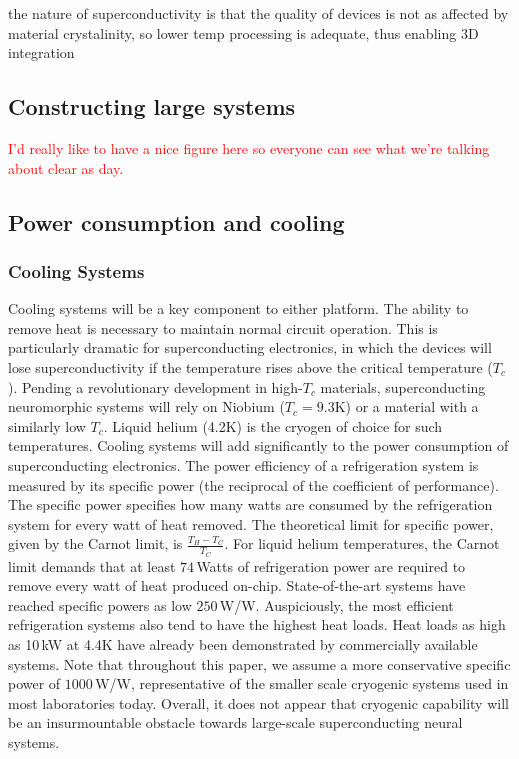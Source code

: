 \documentclass[twocolumn]{article}
\begin{document}
the nature of superconductivity is that the quality of devices is not as affected by material crystalinity, so lower temp processing is adequate, thus enabling 3D integration

\subsection{Constructing large systems}

\textcolor{Red}{I'd really like to have a nice figure here so everyone can see what we're talking about clear as day.}

\subsection{Power consumption and cooling}

\subsubsection{Cooling Systems}
Cooling systems will be a key component to either platform. The ability to remove heat is necessary to maintain normal circuit operation. This is particularly dramatic for superconducting electronics, in which the devices will lose superconductivity if the temperature rises above the critical temperature ($T_c$). Pending a revolutionary development in high-$T_c$ materials, superconducting neuromorphic systems will rely on Niobium ($T_c = 9.3$K) or a material with a similarly low $T_c$. Liquid helium (4.2K) is the cryogen of choice for such temperatures. Cooling systems will add significantly to the power consumption of superconducting electronics. The power efficiency of a refrigeration system is measured by its specific power (the reciprocal of the coefficient of performance). The specific power specifies how many watts are consumed by the refrigeration system for every watt of heat removed. The theoretical limit for specific power, given by the Carnot limit, is $\frac{T_H - T_C}{T_C}$. For liquid helium temperatures, the Carnot limit demands that at least $74$\,Watts of refrigeration power are required to remove every watt of heat produced on-chip. State-of-the-art systems have reached specific powers as low $250$\,W/W. Auspiciously, the most efficient refrigeration systems also tend to have the highest heat loads. Heat loads as high as 10\,kW at 4.4K have already been demonstrated by commercially available systems. Note that throughout this paper, we assume a more conservative specific power of $1000$\,W/W, representative of the smaller scale cryogenic systems used in most laboratories today. Overall, it does not appear that cryogenic capability will be an insurmountable obstacle towards large-scale superconducting neural systems.
\end{document}
